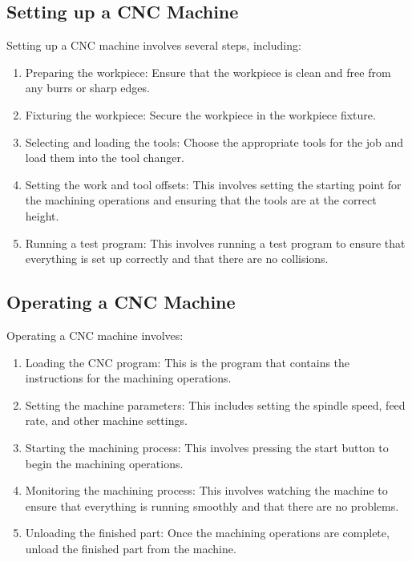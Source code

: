 \documentclass{article}
\begin{document}
\subsection{Setting up a CNC Machine}
Setting up a CNC machine involves several steps, including:
\begin{enumerate}
    \item Preparing the workpiece: Ensure that the workpiece is clean and free from any burrs or sharp edges.
    \item Fixturing the workpiece: Secure the workpiece in the workpiece fixture.
    \item Selecting and loading the tools: Choose the appropriate tools for the job and load them into the tool changer.
    \item Setting the work and tool offsets: This involves setting the starting point for the machining operations and ensuring that the tools are at the correct height.
    \item Running a test program: This involves running a test program to ensure that everything is set up correctly and that there are no collisions.
\end{enumerate}

\subsection{Operating a CNC Machine}
Operating a CNC machine involves:
\begin{enumerate}
    \item Loading the CNC program: This is the program that contains the instructions for the machining operations.
    \item Setting the machine parameters: This includes setting the spindle speed, feed rate, and other machine settings.
    \item Starting the machining process: This involves pressing the start button to begin the machining operations.
    \item Monitoring the machining process: This involves watching the machine to ensure that everything is running smoothly and that there are no problems.
    \item Unloading the finished part: Once the machining operations are complete, unload the finished part from the machine.
\end{enumerate}
\end{document}
